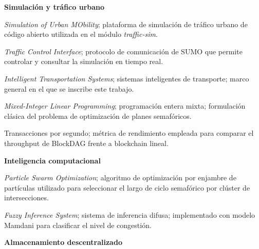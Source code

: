 \vspace{0.8cm}
\noindent\textbf{Simulación y tráfico urbano}

\vspace{0.3cm}

\begin{description}[leftmargin=3cm, style=sameline, font=\normalfont]
  \item[SUMO]    \textit{Simulation of Urban MObility}; plataforma de simulación de tráfico
                 urbano de código abierto utilizada en el módulo \textit{traffic-sim}.
  \item[TraCI]   \textit{Traffic Control Interface}; protocolo de comunicación de SUMO que
                 permite controlar y consultar la simulación en tiempo real.
  \item[ITS]     \textit{Intelligent Transportation Systems}; sistemas inteligentes de
                 transporte; marco general en el que se inscribe este trabajo.
  \item[MILP]    \textit{Mixed-Integer Linear Programming}; programación entera mixta;
                 formulación clásica del problema de optimización de planes semafóricos.
  \item[TPS]     Transacciones por segundo; métrica de rendimiento empleada para comparar
                 el throughput de BlockDAG frente a blockchain lineal.
\end{description}

\vspace{0.8cm}
\noindent\textbf{Inteligencia computacional}

\vspace{0.3cm}

\begin{description}[leftmargin=3cm, style=sameline, font=\normalfont]
  \item[PSO]     \textit{Particle Swarm Optimization}; algoritmo de optimización por
                 enjambre de partículas utilizado para seleccionar el largo de ciclo semafórico por clúster de intersecciones.
  \item[FIS]     \textit{Fuzzy Inference System}; sistema de inferencia difusa; implementado
                 con modelo Mamdani para clasificar el nivel de congestión.
\end{description}

\vspace{0.8cm}
\noindent\textbf{Almacenamiento descentralizado}

\vspace{0.3cm}


